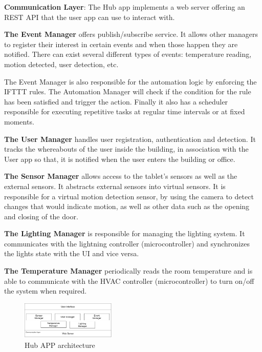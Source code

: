 \documentclass[conference]{IEEEtran}
\begin{document}
\textbf{Communication Layer}: The Hub app implements a web server offering an \ac{REST} \ac{API} that the user app can use to interact with. 

\textbf{The Event Manager} offers publish/subscribe service. It allows other managers to register their interest in certain events and when those happen they are notified. There can exist several different types of events: temperature reading, motion detected, user detection, etc.

The Event Manager is also responsible for the automation logic by enforcing the \ac{IFTTT} rules. The Automation Manager will check if the condition for the rule has been satisfied and trigger the action. Finally it also has a scheduler responsible for executing repetitive tasks at regular time intervals or at fixed moments.


\textbf{The User Manager} handles user registration, authentication and detection. It tracks the whereabouts of the user inside the building, in association with the User app so that, it is notified when the user enters the building or office.


\textbf{The Sensor Manager} allows access to the tablet's sensors as well as the external sensors. It abstracts external sensors into virtual sensors. It is responsible for a virtual motion detection sensor, by using the camera to detect changes that would indicate motion, as well as other data such as the opening and closing of the door.


\textbf{The Lighting Manager} is responsible for managing the lighting system. It communicates with the lightning controller (microcontroller) and synchronizes the lights state with the \ac{UI} and vice versa.

\textbf{The Temperature Manager} periodically reads the room temperature and is able to communicate with the \ac{HVAC} controller (microcontroller) to turn on/off the system when required.


\begin{figure}[h]
\centering
\includegraphics[width=0.4\textwidth]{Figures/software_hub}
\caption{Hub APP architecture }
\label{software2}
\end{figure}
\end{document}

